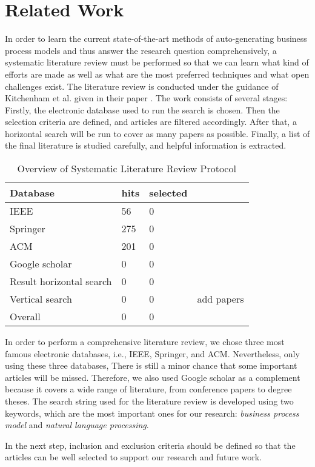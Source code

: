 \chapter{Related Work}
\label{sec:works}

	In order to learn the current state-of-the-art methods of auto-generating business process models and thus answer the research question comprehensively, a systematic literature review must be performed so that we can learn what kind of efforts are made as well as what are the most preferred techniques and what open challenges exist. The literature review is conducted under the guidance of Kitchenham et al. given in their paper \cite{literature_review_guidance}. The work consists of several stages: Firstly, the electronic database used to run the search is chosen. Then the selection criteria are defined, and articles are filtered accordingly. After that, a horizontal search will be run to cover as many papers as possible. Finally, a list of the final literature is studied carefully, and helpful information is extracted.

	\begin{table}[]
		\centering
		\caption{\centering Overview of Systematic Literature Review Protocol}
		\begin{tabular}{llll}
    	\textbf{Database}\hspace{30mm} & \textbf{hits} \hspace{10mm} & \textbf{selected} &  \\
    	\hline
		IEEE                     		& 56   & 0  &      		\\
		Springer                 		& 275  & 0  &      		\\
		ACM                      		& 201  & 0  &      		\\
		Google scholar           		& 0    & 0  &      		\\
		\hline
		Result horizontal search	 	& 0    & 0  &      		\\
		Vertical search          		& 0    & 0  &  \hspace{5mm}add papers  \\
		\hline
		Overall                  		& 0    & 0  &     
		\end{tabular}
	\end{table}
	
	In order to perform a comprehensive literature review, we chose three most famous electronic databases, i.e., IEEE, Springer, and ACM. Nevertheless, only using these three databases, There is still a minor chance that some important articles will be missed. Therefore, we also used Google scholar as a complement because it covers a wide range of literature, from conference papers to degree theses. The search string used for the literature review is developed using two keywords, which are the most important ones for our research: \textit{business process model} and \textit{natural language processing}.
	
	In the next step, inclusion and exclusion criteria should be defined so that the articles can be well selected to support our research and future work. 